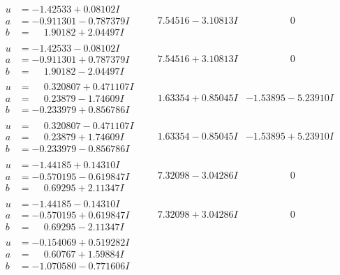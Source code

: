 \documentclass[1p]{elsarticle_modified}
\theoremstyle{definition}
\begin{document}
$$\begin{array}{c|c|c}
\begin{aligned}
u &= -1.42533 + 0.08102 I \\
a &= -0.911301 - 0.787379 I \\
b &= \phantom{-}1.90182 + 2.04497 I\end{aligned}
 & \phantom{-}7.54516 - 3.10813 I & \phantom{-0.000000 } 0 \\ \hline\begin{aligned}
u &= -1.42533 - 0.08102 I \\
a &= -0.911301 + 0.787379 I \\
b &= \phantom{-}1.90182 - 2.04497 I\end{aligned}
 & \phantom{-}7.54516 + 3.10813 I & \phantom{-0.000000 } 0 \\ \hline\begin{aligned}
u &= \phantom{-}0.320807 + 0.471107 I \\
a &= \phantom{-}0.23879 - 1.74609 I \\
b &= -0.233979 + 0.856786 I\end{aligned}
 & \phantom{-}1.63354 + 0.85045 I & -1.53895 - 5.23910 I \\ \hline\begin{aligned}
u &= \phantom{-}0.320807 - 0.471107 I \\
a &= \phantom{-}0.23879 + 1.74609 I \\
b &= -0.233979 - 0.856786 I\end{aligned}
 & \phantom{-}1.63354 - 0.85045 I & -1.53895 + 5.23910 I \\ \hline\begin{aligned}
u &= -1.44185 + 0.14310 I \\
a &= -0.570195 - 0.619847 I \\
b &= \phantom{-}0.69295 + 2.11347 I\end{aligned}
 & \phantom{-}7.32098 - 3.04286 I & \phantom{-0.000000 } 0 \\ \hline\begin{aligned}
u &= -1.44185 - 0.14310 I \\
a &= -0.570195 + 0.619847 I \\
b &= \phantom{-}0.69295 - 2.11347 I\end{aligned}
 & \phantom{-}7.32098 + 3.04286 I & \phantom{-0.000000 } 0 \\ \hline\begin{aligned}
u &= -0.154069 + 0.519282 I \\
a &= \phantom{-}0.60767 + 1.59884 I \\
b &= -1.070580 - 0.771606 I\end{aligned}

\end{array}$$
\end{document}
